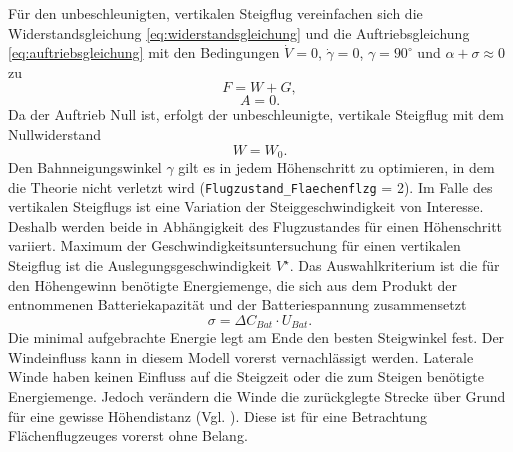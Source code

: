 Für den unbeschleunigten, vertikalen Steigflug vereinfachen sich die Widerstandsgleichung \ref{eq:widerstandsgleichung} und die Auftriebsgleichung \ref{eq:auftriebsgleichung} mit den Bedingungen \ensuremath{\dot{V} = 0}, \ensuremath{\dot{\gamma} = 0}, \ensuremath{\gamma = 90^\circ} und \ensuremath{\alpha + \sigma \approx 0} zu 
\begin{equation}
	F = W + G , 
\end{equation}
\begin{equation}
	A = 0 .
\end{equation}
Da der Auftrieb Null ist, erfolgt der unbeschleunigte, vertikale Steigflug mit dem Nullwiderstand
\begin{equation}
	W = W_0 .
\end{equation}
Den Bahnneigungswinkel \ensuremath{\gamma} gilt es in jedem Höhenschritt zu optimieren, in dem die Theorie nicht verletzt wird (\texttt{Flugzustand\_Flaechenflzg} = 2). Im Falle des vertikalen Steigflugs ist eine Variation der Steiggeschwindigkeit von Interesse. Deshalb werden beide in Abhängigkeit des Flugzustandes für einen Höhenschritt variiert. Maximum der Geschwindigkeitsuntersuchung für einen vertikalen Steigflug ist die Auslegungsgeschwindigkeit \ensuremath{V^\star}. Das Auswahlkriterium ist die für den Höhengewinn benötigte Energiemenge, die sich aus dem Produkt der entnommenen Batteriekapazität und der Batteriespannung zusammensetzt
\begin{equation}
	\sigma = \Delta C_{Bat}\cdot U_{Bat}.
\end{equation}
Die minimal aufgebrachte Energie legt am Ende den besten Steigwinkel fest.
Der Windeinfluss kann in diesem Modell vorerst vernachlässigt werden. Laterale Winde haben keinen Einfluss auf die Steigzeit oder die zum Steigen benötigte Energiemenge. Jedoch verändern die Winde die zurückglegte Strecke über Grund für eine gewisse Höhendistanz (Vgl. \cite[S.241-242]{Scheiderer.2008}). Diese ist für eine Betrachtung Flächenflugzeuges vorerst ohne Belang. 


